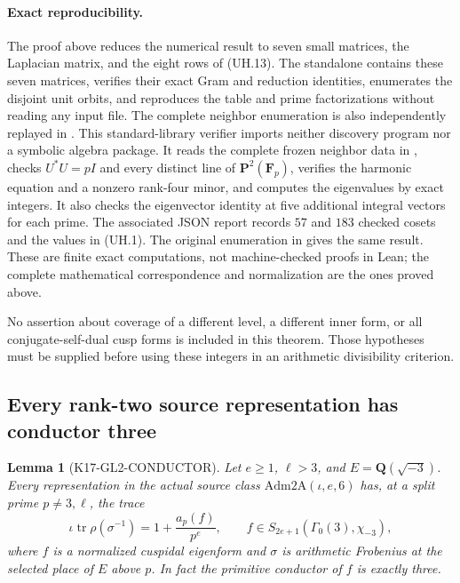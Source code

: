 \documentclass[11pt,a4paper]{article}
\newtheorem{lemma}[theorem]{Lemma}
\theoremstyle{definition}
\begin{document}
\paragraph{Exact reproducibility.}
The proof above reduces the numerical result to seven small matrices,
the Laplacian matrix, and the eight rows of (UH.13).  The standalone
 contains these
seven matrices, verifies their exact Gram and reduction identities,
enumerates the disjoint unit orbits, and reproduces the table and
prime factorizations without reading any input file.  The complete
neighbor enumeration is also independently replayed in
.
This standard-library verifier imports neither discovery program nor
a symbolic algebra package.  It reads the complete frozen neighbor
data in , checks $U^*U=pI$
and every distinct line of $\mathbf P^2(\mathbf F_p)$, verifies the
harmonic equation and a nonzero rank-four minor, and computes the
eigenvalues by exact integers.  It also checks the eigenvector identity
at five additional integral vectors for each prime.  The associated
JSON report records $57$ and $183$ checked cosets and the values in
(UH.1).  The original enumeration in 
gives the same result.  These are finite exact computations, not
machine-checked proofs in Lean; the complete mathematical correspondence
and normalization are the ones proved above.

No assertion about coverage of a different level, a different inner
form, or all conjugate-self-dual cusp forms is included in this theorem.
Those hypotheses must be supplied before using these integers in an
arithmetic divisibility criterion.

\subsection{Every rank-two source representation has conductor three}
\label{sec:gl2-conductor}

\begin{lemma}[K17-GL2-CONDUCTOR]\label{lem:gl2-conductor}
Let $e\geq1$, $\ell>3$, and $E=\mathbf Q(\sqrt{-3})$.
Every representation in the actual source class
$\mathrm{Adm2A}(\iota,e,6)$ has, at a split prime $p\ne3,\ell$,
the trace
\[
 \iota\operatorname{tr}\rho(\sigma^{-1})
       =1+\frac{a_p(f)}{p^e},
 \qquad
 f\in S_{2e+1}(\Gamma_0(3),\chi_{-3}),
\]
where $f$ is a normalized cuspidal eigenform and $\sigma$ is arithmetic
Frobenius at the selected place of $E$ above $p$.
In fact the primitive conductor of $f$ is exactly three.
\end{lemma}
\end{document}
